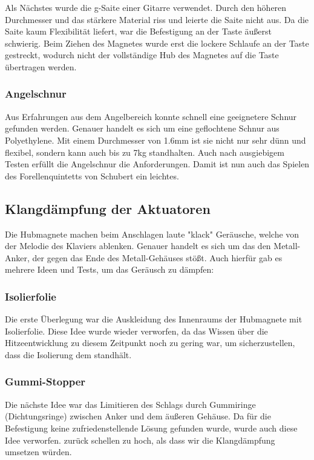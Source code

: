 Als Nächstes wurde die g-Saite einer Gitarre verwendet.
Durch den höheren Durchmesser und das stärkere Material riss und leierte die Saite nicht aus.
Da die Saite kaum Flexibilität liefert, war die Befestigung an der Taste äußerst schwierig.
Beim Ziehen des Magnetes wurde erst die lockere Schlaufe an der Taste gestreckt, wodurch nicht der vollständige Hub des Magnetes auf die Taste übertragen werden.

\subsubsection{Angelschnur}

Aus Erfahrungen aus dem Angelbereich konnte schnell eine geeignetere Schnur gefunden werden.
Genauer handelt es sich um eine geflochtene Schnur aus Polyethylene.
Mit einem Durchmesser von 1.6mm ist sie nicht nur sehr dünn und flexibel, sondern kann auch bis zu 7kg standhalten.
Auch nach ausgiebigem Testen erfüllt die Angelschnur die Anforderungen.
Damit ist nun auch das Spielen des Forellenquintetts von Schubert ein leichtes.

\subsection{Klangdämpfung der Aktuatoren}
Die Hubmagnete machen beim Anschlagen laute "klack" Geräusche, welche von der Melodie des Klaviers ablenken.
Genauer handelt es sich um das den Metall-Anker, der gegen das Ende des Metall-Gehäuses stößt.
Auch hierfür gab es mehrere Ideen und Tests, um das Geräusch zu dämpfen:

\subsubsection{Isolierfolie}

Die erste Überlegung war die Auskleidung des Innenraums der Hubmagnete mit Isolierfolie.
Diese Idee wurde wieder verworfen, da das Wissen über die Hitzeentwicklung zu diesem Zeitpunkt noch zu gering war, um sicherzustellen, dass die Isolierung dem standhält.

\subsubsection{Gummi-Stopper}

Die nächste Idee war das Limitieren des Schlags durch Gummiringe (Dichtungsringe) zwischen Anker und dem äußeren Gehäuse.
Da für die Befestigung keine zufriedenstellende Lösung gefunden wurde, wurde auch diese Idee verworfen.
zurück schellen zu hoch, als dass wir die Klangdämpfung umsetzen würden.


